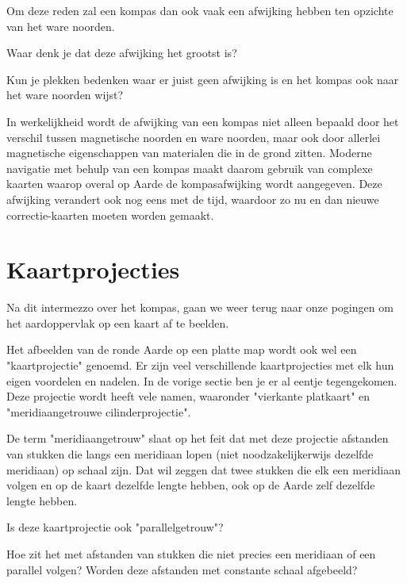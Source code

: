 Om deze reden zal een kompas dan ook vaak een afwijking hebben ten opzichte van het ware noorden.

\begin{opgave}
	\begin{subopgave}
		Waar denk je dat deze afwijking het grootst is?
	\end{subopgave}
	\begin{subopgave}
		Kun je plekken bedenken waar er juist geen afwijking is en het kompas ook naar het ware noorden wijst?
	\end{subopgave}
\end{opgave}

In werkelijkheid wordt de afwijking van een kompas niet alleen bepaald door het verschil tussen magnetische noorden en ware noorden, maar ook door allerlei magnetische eigenschappen van materialen die in de grond zitten. Moderne navigatie met behulp van een kompas maakt daarom gebruik van complexe kaarten waarop overal op Aarde de kompasafwijking wordt aangegeven. Deze afwijking verandert ook nog eens met de tijd, waardoor zo nu en dan nieuwe correctie-kaarten moeten worden gemaakt.

\section{Kaartprojecties}

Na dit intermezzo over het kompas, gaan we weer terug naar onze pogingen om het aardoppervlak op een kaart af te beelden.

Het afbeelden van de ronde Aarde op een platte map wordt ook wel een "kaartprojectie" genoemd. Er zijn veel verschillende kaartprojecties met elk hun eigen voordelen en nadelen. In de vorige sectie ben je er al eentje tegengekomen. Deze projectie wordt heeft vele namen, waaronder "vierkante platkaart" en "meridiaangetrouwe cilinderprojectie".

De term "meridiaangetrouw" slaat op het feit dat met deze projectie afstanden van stukken die langs een meridiaan lopen (niet noodzakelijkerwijs dezelfde meridiaan) op schaal zijn. Dat wil zeggen dat twee stukken die elk een meridiaan volgen en op de kaart dezelfde lengte hebben, ook op de Aarde zelf dezelfde lengte hebben.

\begin{opgave}
	\begin{subopgave}
		Is deze kaartprojectie ook "parallelgetrouw"?
	\end{subopgave}
	\begin{subopgave}
		Hoe zit het met afstanden van stukken die niet precies een meridiaan of een parallel volgen? Worden deze afstanden met constante schaal afgebeeld?
	\end{subopgave}
\end{opgave}

